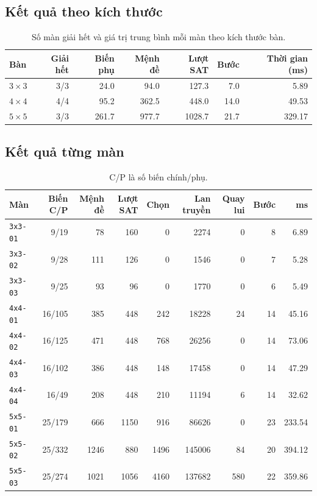 \documentclass[12pt,a4paper]{article}
\begin{document}
    \subsection{Kết quả theo kích thước}
    \begin{table}[H]
    \centering\small
    \begin{tabular}{@{}lrrrrrr@{}}
    \toprule
    Bàn & Giải hết & Biến phụ & Mệnh đề & Lượt SAT & Bước & Thời gian (ms) \\
    \midrule
    $3 \times 3$ & 3/3 & 24.0 & 94.0 & 127.3 & 7.0 & 5.89 \\
    $4 \times 4$ & 4/4 & 95.2 & 362.5 & 448.0 & 14.0 & 49.53 \\
    $5 \times 5$ & 3/3 & 261.7 & 977.7 & 1028.7 & 21.7 & 329.17 \\
    \bottomrule
    \end{tabular}
    \caption{Số màn giải hết và giá trị trung bình mỗi màn theo kích thước bàn.}
    \label{tab:benchmark_summary}
    \end{table}
    \subsection{Kết quả từng màn}
    \begin{table}[H]
    \centering\small
    \setlength{\tabcolsep}{4pt}
    \begin{tabular}{@{}lrrrrrrrr@{}}
    \toprule
    Màn & Biến C/P & Mệnh đề & Lượt SAT & Chọn & Lan truyền & Quay lui & Bước & ms \\
    \midrule
    \texttt{3x3-01} & 9/19 & 78 & 160 & 0 & 2274 & 0 & 8 & 6.89 \\
    \texttt{3x3-02} & 9/28 & 111 & 126 & 0 & 1546 & 0 & 7 & 5.28 \\
    \texttt{3x3-03} & 9/25 & 93 & 96 & 0 & 1770 & 0 & 6 & 5.49 \\
    \texttt{4x4-01} & 16/105 & 385 & 448 & 242 & 18228 & 24 & 14 & 45.16 \\
    \texttt{4x4-02} & 16/125 & 471 & 448 & 768 & 26256 & 0 & 14 & 73.06 \\
    \texttt{4x4-03} & 16/102 & 386 & 448 & 148 & 17458 & 0 & 14 & 47.29 \\
    \texttt{4x4-04} & 16/49 & 208 & 448 & 210 & 11194 & 6 & 14 & 32.62 \\
    \texttt{5x5-01} & 25/179 & 666 & 1150 & 916 & 86626 & 0 & 23 & 233.54 \\
    \texttt{5x5-02} & 25/332 & 1246 & 880 & 1496 & 145006 & 84 & 20 & 394.12 \\
    \texttt{5x5-03} & 25/274 & 1021 & 1056 & 4160 & 137682 & 580 & 22 & 359.86 \\
    \bottomrule
    \end{tabular}
    \caption{C/P là số biến chính/phụ.}
    \label{tab:benchmark_detailed}
    \end{table}
\end{document}
